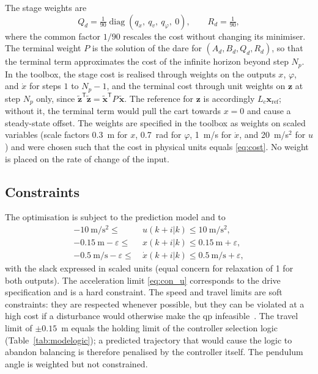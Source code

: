 The stage weights are
\begin{equation}
  Q_d = \tfrac{1}{90}\operatorname{diag}(q_x,\ q_v,\ q_\varphi,\ 0), \qquad
  R_d = \tfrac{1}{90},
  \label{eq:QdRd}
\end{equation}
where the common factor $1/90$ rescales the cost without changing its
minimiser. The terminal weight $P$ is the solution of the \ac{dare} for
$(A_d, B_d, Q_d, R_d)$, so that the terminal term approximates the cost of the
infinite horizon beyond step $N_p$. In the toolbox, the stage cost is realised
through weights on the outputs $x$, $\varphi$, and $\dot{x}$ for steps $1$ to
$N_p - 1$, and the terminal cost through unit weights on $\mathbf{z}$ at step
$N_p$ only, since $\tilde{\mathbf{z}}^{\mathsf{T}}\tilde{\mathbf{z}} =
\tilde{\mathbf{x}}^{\mathsf{T}}P\,\tilde{\mathbf{x}}$. The reference for
$\mathbf{z}$ is accordingly $L_c\mathbf{x}_{\mathrm{ref}}$; without it, the
terminal term would pull the cart towards $x = 0$ and cause a steady-state
offset. The weights are specified in the toolbox as weights on scaled
variables (scale factors 0.3~m for $x$, 0.7~rad for $\varphi$, 1~m/s for
$\dot{x}$, and 20~m/s$^2$ for $u$) and were chosen such that the cost in
physical units equals \eqref{eq:cost}. No weight is placed on the rate of
change of the input.

\subsection{Constraints}
\label{subsec:constraints}

The optimisation is subject to the prediction model and to
\begin{align}
  -10~\mathrm{m/s^2} \le\ & u(k+i|k) \le 10~\mathrm{m/s^2},
  \label{eq:con_u}\\
  -0.15~\mathrm{m} - \varepsilon \le\ & x(k+i|k) \le 0.15~\mathrm{m} + \varepsilon,
  \label{eq:con_x}\\
  -0.5~\mathrm{m/s} - \varepsilon \le\ & \dot{x}(k+i|k) \le 0.5~\mathrm{m/s} + \varepsilon,
  \label{eq:con_v}
\end{align}
with the slack expressed in scaled units (equal concern for relaxation of 1
for both outputs). The acceleration limit \eqref{eq:con_u} corresponds to the
drive specification and is a hard constraint. The speed and travel limits are
soft constraints: they are respected whenever possible, but they can be
violated at a high cost if a disturbance would otherwise make the \ac{qp}
infeasible~\cite{rawlings2000}. The travel limit of $\pm 0.15$~m equals the
holding limit of the controller selection logic (Table~\ref{tab:modelogic});
a predicted trajectory that would cause the logic to abandon balancing is
therefore penalised by the controller itself. The pendulum angle is weighted but not
constrained.


